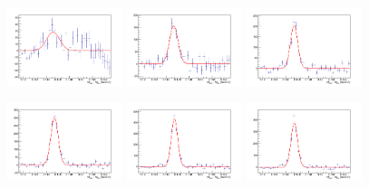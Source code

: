 \begin{figure}[!h]
\begin{center}
\includegraphics[width=0.3\textwidth]{figures/Dstar/pp13TeV/multi_trial/residual_plot_std_bkg_func_1-1dot5GeV.png} 
\includegraphics[width=0.3\textwidth]{figures/Dstar/pp13TeV/multi_trial/residual_plot_std_bkg_func_1dot5-2GeV.png}
\includegraphics[width=0.3\textwidth]{figures/Dstar/pp13TeV/multi_trial/residual_plot_std_bkg_func_2-2dot5GeV.png} 

\includegraphics[width=0.3\textwidth]{figures/Dstar/pp13TeV/multi_trial/residual_plot_stdBkg_func_2dot5-3GeV.png} 
\includegraphics[width=0.3\textwidth]{figures/Dstar/pp13TeV/multi_trial/residual_plot_std_bkg_func_3-3dot5GeV.png}
\includegraphics[width=0.3\textwidth]{figures/Dstar/pp13TeV/multi_trial/residual_plot_std_bkg_func_3dot5-4GeV.png} 


\end{center}
\end{figure}
